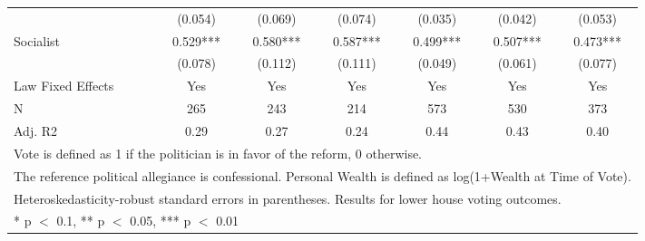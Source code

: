 \begin{table}
\begin{tabular}[t]{lcccccc}
 & (\num{0.054}) & (\num{0.069}) & (\num{0.074}) & (\num{0.035}) & (\num{0.042}) & (\num{0.053})\\
Socialist & \num{0.529}*** & \num{0.580}*** & \num{0.587}*** & \num{0.499}*** & \num{0.507}*** & \num{0.473}***\\
 & (\num{0.078}) & (\num{0.112}) & (\num{0.111}) & (\num{0.049}) & (\num{0.061}) & (\num{0.077})\\
\midrule
Law Fixed Effects & Yes & Yes & Yes & Yes & Yes & Yes\\
N & \num{265} & \num{243} & \num{214} & \num{573} & \num{530} & \num{373}\\
Adj. R2 & \num{0.29} & \num{0.27} & \num{0.24} & \num{0.44} & \num{0.43} & \num{0.40}\\
\bottomrule
\multicolumn{7}{l}{\rule{0pt}{1em}Vote is defined as 1 if the politician is in favor of the reform, 0 otherwise.}\\
\multicolumn{7}{l}{\rule{0pt}{1em}The reference political allegiance is confessional. Personal Wealth is defined as log(1+Wealth at Time of Vote).}\\
\multicolumn{7}{l}{\rule{0pt}{1em}Heteroskedasticity-robust standard errors in parentheses. Results for lower house voting outcomes.}\\
\multicolumn{7}{l}{\rule{0pt}{1em}* p $<$ 0.1, ** p $<$ 0.05, *** p $<$ 0.01}\\
\end{tabular}
\end{table}
